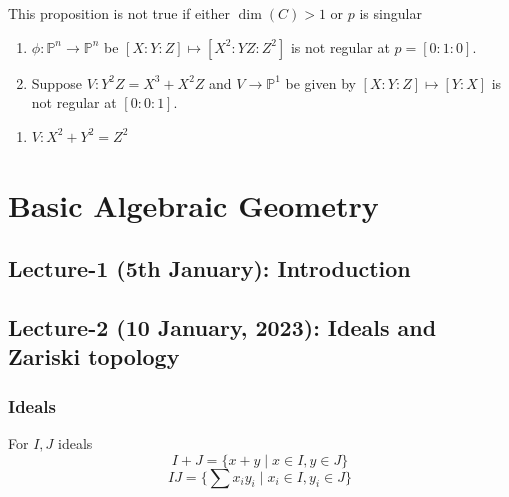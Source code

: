 \documentclass[oneside, 12pt, ]{scrbook}
\newcommand{\PP}{\mathbb{P}}
\theoremstyle{theorem}
\begin{document}
\begin{remark}
This proposition is not true if either $\dim(C) > 1$ or $p$ is singular 
\begin{enumerate}
\item $\phi: \PP^n \rightarrow \PP^n$ be $[X:Y:Z] \mapsto [X^2 : YZ : Z^2]$ is not regular at $p = [0:1:0]$.
\item Suppose $V : Y^2 Z = X^3 + X^2 Z$ and $V \rightarrow \PP^1$ be given by $[X:Y:Z] \mapsto [Y:X]$ is not regular at $[0:0:1]$.
\end{enumerate}
\end{remark}

\begin{example}
\begin{enumerate}
\item $V: X^2 + Y^2 = Z^2$
\end{enumerate}
\end{example}





















\part{Basic Algebraic Geometry}

\chapter{Lecture-1 (5th January): Introduction}

\chapter{Lecture-2 (10 January, 2023): Ideals and Zariski topology}

\section{Ideals}
For $I,J$ ideals $$I+J = \{x+y \mid x\in I, y\in J\}$$ $$IJ = \{\sum x_{i}y_{i} \mid x_{i} \in I, y_{i} \in J\}$$
\end{document}
